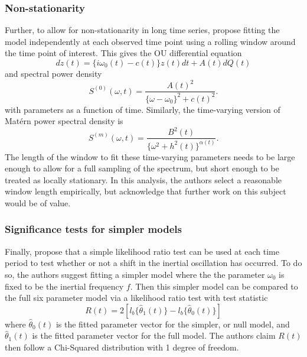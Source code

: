 \documentclass{stat572Style}
\begin{document}
\subsubsection{Non-stationarity}
Further, to allow for non-stationarity in long time series, \citep{Sykulski2016} propose fitting the model independently at each observed time point using a rolling window around the time point of interest. This gives the OU differential equation
\begin{equation}
dz(t) = \{i \omega_{0}(t) - c(t) \} z(t) dt + A(t) dQ(t)
\end{equation}
and spectral power density
\begin{equation}
S^{(0)}(\omega, t) = \frac{A(t)^{2}}{\{\omega - \omega_{0}\}^{2} + c(t)^{2}}. 
\end{equation}
with parameters as a function of time. Similarly, the time-varying version of Mat\'{e}rn power spectral density is 
\begin{equation}
S^{(m)}(\omega, t) = \frac{B^{2}(t)}{\{\omega^{2} + h^{2}(t)\}^{\alpha(t)}}.
\end{equation}
The length of the window to fit these time-varying parameters needs to be large enough to allow for a full sampling of the spectrum, but short enough to be treated as locally stationary.  In this analysis, the authors select a reasonable window length empirically, but acknowledge that further work on this subject would be of value.  

\subsubsection{Significance tests for simpler models}
Finally, \citet{Sykulski2016} propose that a simple likelihood ratio test can be used at each time period to test whether or not a shift in the inertial oscillation has occurred. To do so, the authors suggest fitting a simpler model where the the parameter $\omega_{0}$ is fixed to be the inertial frequency $f$. Then this simpler model can be compared to the full six parameter model via a likelihood ratio test with test statistic
\begin{equation}
\label{eq: LRT}
R(t) = 2[l_{b} \{\hat{\theta}_{1}(t) \} - l_{b}\{\hat{\theta}_{0}(t) \} ]
\end{equation}
where $\hat{\theta}_{0}(t)$ is the fitted parameter vector for the simpler, or null model, and $\hat{\theta}_{1}(t)$ is the fitted parameter vector for the full model. The authors claim $R(t)$ then follow a Chi-Squared distribution with 1 degree of freedom.
\end{document}
